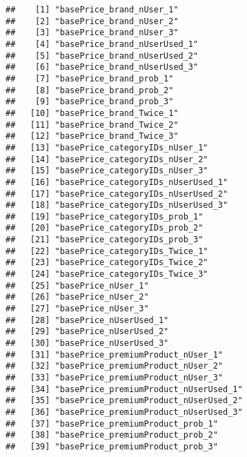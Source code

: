\documentclass[10pt]{report}
\begin{document}
\begin{verbatim}
##    [1] "basePrice_brand_nUser_1"                              
##    [2] "basePrice_brand_nUser_2"                              
##    [3] "basePrice_brand_nUser_3"                              
##    [4] "basePrice_brand_nUserUsed_1"                          
##    [5] "basePrice_brand_nUserUsed_2"                          
##    [6] "basePrice_brand_nUserUsed_3"                          
##    [7] "basePrice_brand_prob_1"                               
##    [8] "basePrice_brand_prob_2"                               
##    [9] "basePrice_brand_prob_3"                               
##   [10] "basePrice_brand_Twice_1"                              
##   [11] "basePrice_brand_Twice_2"                              
##   [12] "basePrice_brand_Twice_3"                              
##   [13] "basePrice_categoryIDs_nUser_1"                        
##   [14] "basePrice_categoryIDs_nUser_2"                        
##   [15] "basePrice_categoryIDs_nUser_3"                        
##   [16] "basePrice_categoryIDs_nUserUsed_1"                    
##   [17] "basePrice_categoryIDs_nUserUsed_2"                    
##   [18] "basePrice_categoryIDs_nUserUsed_3"                    
##   [19] "basePrice_categoryIDs_prob_1"                         
##   [20] "basePrice_categoryIDs_prob_2"                         
##   [21] "basePrice_categoryIDs_prob_3"                         
##   [22] "basePrice_categoryIDs_Twice_1"                        
##   [23] "basePrice_categoryIDs_Twice_2"                        
##   [24] "basePrice_categoryIDs_Twice_3"                        
##   [25] "basePrice_nUser_1"                                    
##   [26] "basePrice_nUser_2"                                    
##   [27] "basePrice_nUser_3"                                    
##   [28] "basePrice_nUserUsed_1"                                
##   [29] "basePrice_nUserUsed_2"                                
##   [30] "basePrice_nUserUsed_3"                                
##   [31] "basePrice_premiumProduct_nUser_1"                     
##   [32] "basePrice_premiumProduct_nUser_2"                     
##   [33] "basePrice_premiumProduct_nUser_3"                     
##   [34] "basePrice_premiumProduct_nUserUsed_1"                 
##   [35] "basePrice_premiumProduct_nUserUsed_2"                 
##   [36] "basePrice_premiumProduct_nUserUsed_3"                 
##   [37] "basePrice_premiumProduct_prob_1"                      
##   [38] "basePrice_premiumProduct_prob_2"                      
##   [39] "basePrice_premiumProduct_prob_3"                      

\end{verbatim}
\end{document}
